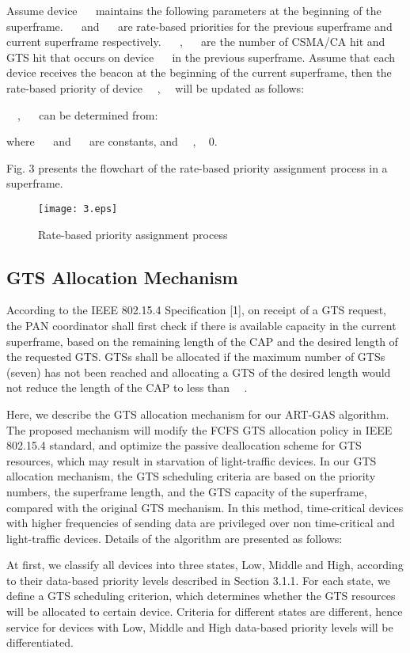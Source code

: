 \documentclass[letterpaper]{sig-alternate-10pt}
\begin{document}
Assume device ~~ maintains the following parameters at the beginning of the ~~ superframe. ~~ and ~~ are rate-based priorities for the previous superframe and current superframe respectively. ~~ , ~~ are the number of CSMA/CA hit and GTS hit that occurs on device ~~ in the previous superframe. Assume that each device receives the beacon at the beginning of the current superframe, then the rate-based priority of device ~~, ~~will be updated as follows:


~~, ~~ can be determined from:





where ~~ and ~~ are constants, and ~~, ~ 0.

Fig. 3 presents the flowchart of the rate-based priority assignment process in a superframe.

\begin{figure}[!t]
\renewcommand{\captionfont}{\bfseries}
\centering
\texttt{[image: 3.eps]}
\centering
\caption{Rate-based priority assignment process}
\label{fig_sim}
\end{figure}

\subsection{GTS Allocation Mechanism}
According to the IEEE 802.15.4 Specification [1], on receipt of a GTS request, the PAN coordinator shall first check if there is available capacity in the current superframe, based on the remaining length of the CAP and the desired length of the requested GTS. GTSs shall be allocated if the maximum number of GTSs (seven) has not been reached and allocating a GTS of the desired length would not reduce the length of the CAP to less than ~~.

Here, we describe the GTS allocation mechanism for our ART-GAS algorithm. The proposed mechanism will modify the FCFS GTS allocation policy in IEEE 802.15.4 standard, and optimize the passive deallocation scheme for GTS resources, which may result in starvation of light-traffic devices. In our GTS allocation mechanism, the GTS scheduling criteria are based on the priority numbers, the superframe length, and the GTS capacity of the superframe, compared with the original GTS mechanism. In this method, time-critical devices with higher frequencies of sending data are privileged over non time-critical and light-traffic devices. Details of the algorithm are presented as follows:

At first, we classify all devices into three states, Low, Middle and High, according to their data-based priority levels described in Section 3.1.1. For each state, we define a GTS scheduling criterion, which determines whether the GTS resources will be allocated to certain device. Criteria for different states are different, hence service for devices with Low, Middle and High data-based priority levels will be differentiated.
\end{document}

